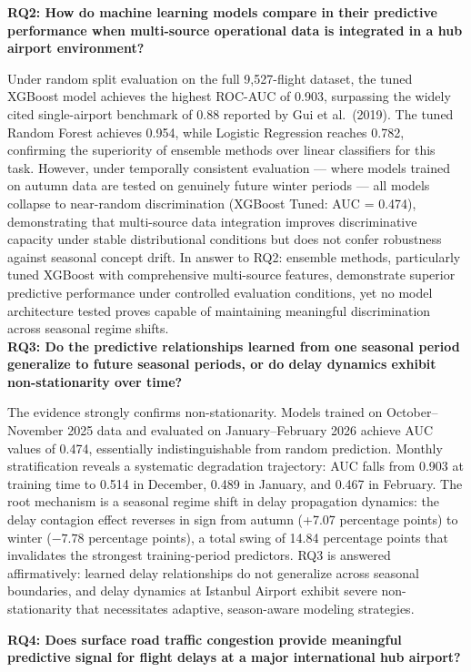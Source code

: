 \documentclass{report}
\begin{document}
\textbf{RQ2: How do machine learning models compare in their predictive performance when
multi-source operational data is integrated in a hub airport environment?}

Under random split evaluation on the full 9,527-flight dataset, the tuned XGBoost model
achieves the highest ROC-AUC of 0.903, surpassing the widely cited single-airport benchmark
of 0.88 reported by Gui et al.\ (2019). The tuned Random Forest achieves 0.954, while
Logistic Regression reaches 0.782, confirming the superiority of ensemble methods over linear
classifiers for this task. However, under temporally consistent evaluation --- where models
trained on autumn data are tested on genuinely future winter periods --- all models collapse
to near-random discrimination (XGBoost Tuned: AUC = 0.474), demonstrating that multi-source
data integration improves discriminative capacity under stable distributional conditions but
does not confer robustness against seasonal concept drift. In answer to RQ2: ensemble methods,
particularly tuned XGBoost with comprehensive multi-source features, demonstrate superior
predictive performance under controlled evaluation conditions, yet no model architecture
tested proves capable of maintaining meaningful discrimination across seasonal regime shifts. \\

\textbf{RQ3: Do the predictive relationships learned from one seasonal period generalize to
future seasonal periods, or do delay dynamics exhibit non-stationarity over time?}

The evidence strongly confirms non-stationarity. Models trained on October--November 2025 data
and evaluated on January--February 2026 achieve AUC values of 0.474, essentially
indistinguishable from random prediction. Monthly stratification reveals a systematic
degradation trajectory: AUC falls from 0.903 at training time to 0.514 in December, 0.489
in January, and 0.467 in February. The root mechanism is a seasonal regime shift in delay
propagation dynamics: the delay contagion effect reverses in sign from autumn
(+7.07 percentage points) to winter ($-7.78$ percentage points), a total swing of 14.84
percentage points that invalidates the strongest training-period predictors. RQ3 is answered
affirmatively: learned delay relationships do not generalize across seasonal boundaries, and
delay dynamics at Istanbul Airport exhibit severe non-stationarity that necessitates
adaptive, season-aware modeling strategies.

\textbf{RQ4: Does surface road traffic congestion provide meaningful predictive signal for
flight delays at a major international hub airport?}
\end{document}
